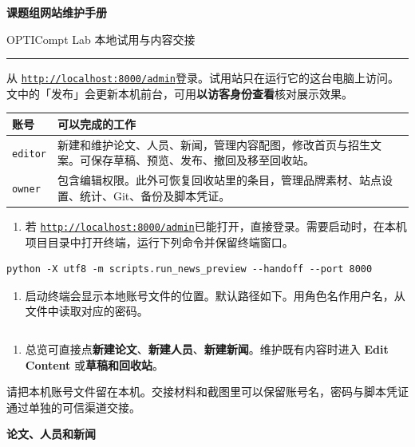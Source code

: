 \documentclass[UTF8,a4paper,zihao=-4,fontset=none]{ctexart}
\newcommand{\key}[1]{\textsf{\textbf{#1}}}
\newcommand{\topic}[1]{\par\vspace{9pt}{\large\sffamily\bfseries\color{navy}#1}\par\vspace{1pt}}
\newcommand{\pagetopic}[1]{{\LARGE\sffamily\bfseries\color{navy}#1}\par\vspace{5pt}}
\newcommand{\notice}[1]{%
  \par\smallskip
  {\setlength{\fboxsep}{9pt}\noindent\colorbox{panel}{%
    \parbox{\dimexpr\linewidth-2\fboxsep\relax}{#1}}}\par\smallskip}
\newcommand{\adminlink}{\href{http://localhost:8000/admin}{\nolinkurl{http://localhost:8000/admin}}}
\newcommand{\pagerule}{\noindent\textcolor{teal}{\rule{34mm}{1.2pt}}\par\vspace{8pt}}
\begin{document}
{\fontsize{28}{34}\selectfont\sffamily\bfseries\color{navy}课题组网站维护手册}\par
{\large\sffamily\color{muted} OPTICompt Lab 本地试用与内容交接}\par
\pagerule

从 \adminlink 登录。试用站只在运行它的这台电脑上访问。文中的「发布」会更新本机前台，可用\key{以访客身份查看}核对展示效果。

\topic{选择账号}

\begin{tabularx}{\linewidth}{@{}p{27mm}Y@{}}
\toprule
\key{账号} & \key{可以完成的工作} \\
\midrule
\texttt{editor} & 新建和维护论文、人员、新闻，管理内容配图，修改首页与招生文案。可保存草稿、预览、发布、撤回及移至回收站。 \\
\texttt{owner} & 包含编辑权限。此外可恢复回收站里的条目，管理品牌素材、站点设置、统计、Git、备份及脚本凭证。 \\
\bottomrule
\end{tabularx}

\topic{首次打开或重启}

\begin{enumerate}
  \item 若 \adminlink 已能打开，直接登录。需要启动时，在本机项目目录中打开终端，运行下列命令并保留终端窗口。
\end{enumerate}
\begin{Verbatim}[fontsize=\small]
python -X utf8 -m scripts.run_news_preview --handoff --port 8000
\end{Verbatim}
\begin{enumerate}[start=2]
  \item 启动终端会显示本地账号文件的位置。默认路径如下。用角色名作用户名，从文件中读取对应的密码。
\end{enumerate}
\begin{Verbatim}[fontsize=\footnotesize]
%LOCALAPPDATA%\OPTICompt Lab\News Preview\preview-credentials.json
\end{Verbatim}
\begin{enumerate}[start=3]
  \item 总览可直接点\key{新建论文}、\key{新建人员}、\key{新建新闻}。维护既有内容时进入 \key{Edit Content} 或\key{草稿和回收站}。
\end{enumerate}

\notice{请把本机账号文件留在本机。交接材料和截图里可以保留账号名，密码与脚本凭证通过单独的可信渠道交接。}

\newpage
\pagetopic{论文、人员和新闻}
\end{document}
